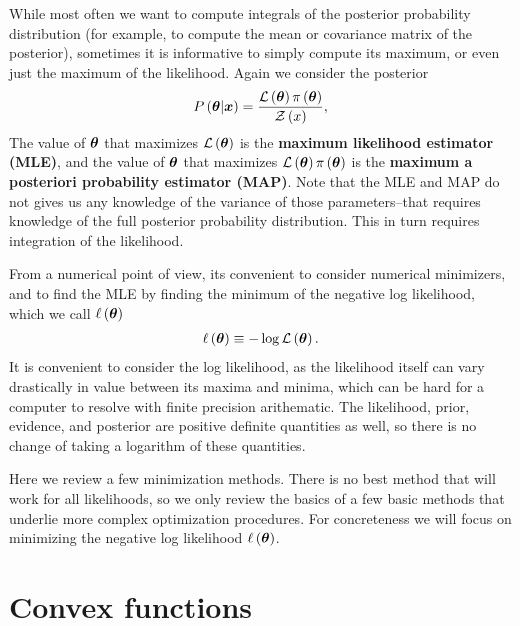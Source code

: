 While most often we want to compute integrals of the posterior
probability distribution (for example, to compute the mean or
covariance matrix of the posterior), sometimes it is informative to
simply compute its maximum, or even just the maximum of the likelihood. 
Again we consider the posterior  
\begin{align}
    \label{eq:Bayes-theorem-optmization}
    P\left({\bm \theta}|{\bm x}\right)
    =
    \frac{
        \mathcal{L}\left({\bm \theta}\right)\pi\left({\bm \theta}\right)
    }{
        \mathcal{Z}\left(x\right)
    }
    ,
\end{align}
The value of ${\bm \theta}$ that maximizes $\mathcal{L}\left({\bm \theta}\right)$ is
the \textbf{maximum likelihood estimator (MLE)}, and the value of
${\bm \theta}$ that maximizes
$\mathcal{L}\left({\bm \theta}\right)\pi\left({\bm \theta}\right)$
is the \textbf{maximum a posteriori probability estimator (MAP)}.
Note that the MLE and MAP do not gives us any knowledge of the variance
of those parameters--that requires knowledge of the full posterior probability distribution.
This in turn requires integration of the likelihood.

From a numerical point of view, its convenient to consider numerical minimizers, and to
find the MLE by finding the minimum of the negative log likelihood, which we call $\ell\left({\bm \theta}\right)$
\begin{align}
    \ell\left({\bm \theta}\right)
    \equiv
    - \log \mathcal{L}\left({\bm \theta}\right)
    .
\end{align}
It is convenient to consider the log likelihood, as the likelihood itself can vary
drastically in value between its maxima and minima, which can be hard for a computer
to resolve with finite precision arithematic.
The likelihood, prior, evidence, and posterior are positive definite quantities as
well, so there is no change of taking a logarithm of these quantities.

Here we review a few minimization methods. 
There is no best method that will work for all likelihoods, so we
only review the basics of a few basic methods that underlie more complex
optimization procedures.
For concreteness we will focus on minimizing the negative log likelihood
$\ell\left({\bm \theta}\right)$. 

\section{Convex functions\label{sec:convex-functions}}

